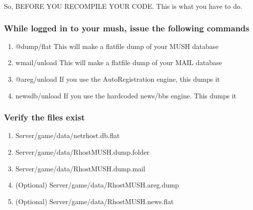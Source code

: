 \documentclass[letterpaper,10pt,english]{sphinxmanual}
\begin{document}
\sphinxAtStartPar
So, BEFORE YOU RECOMPILE YOUR CODE.  This is what you have to do.


\subsubsection{While logged in to your mush, issue the following commands}
\label{\detokenize{legacy:while-logged-in-to-your-mush-issue-the-following-commands}}\begin{enumerate}
%
\item {} 
\sphinxAtStartPar
@dump/flat    \textendash{} This will make a flatfile dump of your MUSH database

\item {} 
\sphinxAtStartPar
wmail/unload  \textendash{} This will make a flatfile dump of your MAIL database

\item {} 
\sphinxAtStartPar
@areg/unload  \textendash{} If you use the AutoRegistration engine, this dumps it

\item {} 
\sphinxAtStartPar
newsdb/unload \textendash{} If you use the hardcoded news/bbs engine.  This dumps it

\end{enumerate}


\subsubsection{Verify the files exist}
\label{\detokenize{legacy:verify-the-files-exist}}\begin{enumerate}
%
\item {} 
\sphinxAtStartPar
Server/game/data/netrhost.db.flat

\item {} 
\sphinxAtStartPar
Server/game/data/RhostMUSH.dump.folder

\item {} 
\sphinxAtStartPar
Server/game/data/RhostMUSH.dump.mail

\item {} 
\sphinxAtStartPar
(Optional) Server/game/data/RhostMUSH.areg.dump

\item {} 
\sphinxAtStartPar
(Optional) Server/game/data/RhostMUSH.news.flat

\end{enumerate}
\end{document}
